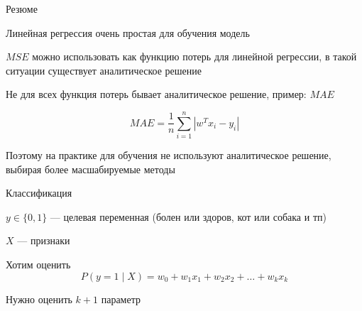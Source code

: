 \documentclass[notes,12pt, aspectratio=169]{beamer}
\newenvironment{wideitemize}{\itemize\addtolength{\itemsep}{10pt}}{\enditemize}
\begin{document}
{
\begin{frame}
\end{frame}
}

\begin{frame}{Резюме}
\begin{wideitemize}
	
	\item  Линейная регрессия очень простая для обучения модель
	
	\item $MSE$ можно использовать как функцию потерь для линейной регрессии, в такой ситуации существует аналитическое решение  
	
	\item Не для всех функция потерь бывает аналитическое решение, пример: $MAE$ 
	
	\[ MAE = \frac{1}{n} \sum_{i=1}^n |w^Tx_i - y_i| \]
	
	\item Поэтому на практике для обучения не используют аналитическое решение, выбирая более масшабируемые методы 
\end{wideitemize} 
\end{frame}


\begin{frame}{Классификация}

\begin{wideitemize}
	\item  $y \in \{0, 1 \}$ — целевая переменная (болен или здоров, кот или собака и тп)
	\item  $X$ — признаки  
	\item Хотим оценить
	\[
	P(y = 1 \mid X) = w_0 + w_1 x_1 + w_2 x_2 + \ldots + w_k x_k
	\]
	\item  Нужно оценить $k+1$ параметр 
\end{wideitemize} 
\end{frame}
\end{document}
